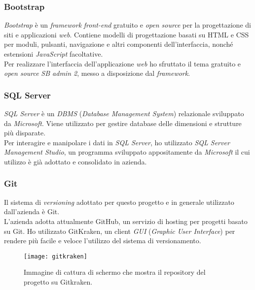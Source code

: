 \subsubsection{Bootstrap}
\textit{Bootstrap} è un \textit{framework} \textit{front-end} gratuito e \textit{open source} per la progettazione di siti e applicazioni \textit{web}. Contiene modelli di progettazione basati su HTML e CSS per moduli, pulsanti, navigazione e altri componenti dell'interfaccia, nonché estensioni \textit{JavaScript} facoltative.\\
Per realizzare l'interfaccia dell'applicazione \textit{web} ho sfruttato il tema gratuito e \textit{open source} \textit{SB admin 2}, messo a disposizione dal \textit{framework}.

\subsubsection{SQL Server}
\textit{SQL Server} è un \textit{DBMS} (\textit{Database Management System}) relazionale sviluppato da \textit{Microsoft}. Viene utilizzato per gestire database delle dimensioni e strutture più disparate.\\
Per interagire e manipolare i dati in \textit{SQL Server}, ho utilizzato \textit{SQL Server Management Studio}, un programma sviluppato appositamente da \textit{Microsoft} il cui utilizzo è già adottato e consolidato in azienda.

\subsubsection{Git}
Il sistema di \textit{versioning} adottato per questo progetto e in generale utilizzato dall'azienda è Git.\\
L'azienda adotta attualmente GitHub, un servizio di hosting per progetti basato su Git.
Ho utilizzato GitKraken, un client \textit{GUI} (\textit{Graphic User Interface}) per rendere più facile e veloce l'utilizzo del sistema di versionamento.

\begin{figure}[htbp]
	\begin{center}
		\texttt{[image: gitkraken]}
		\caption{Immagine di cattura di schermo che mostra il repository del progetto su Gitkraken.}
	\end{center}
\end{figure}

\vspace{10pt}


